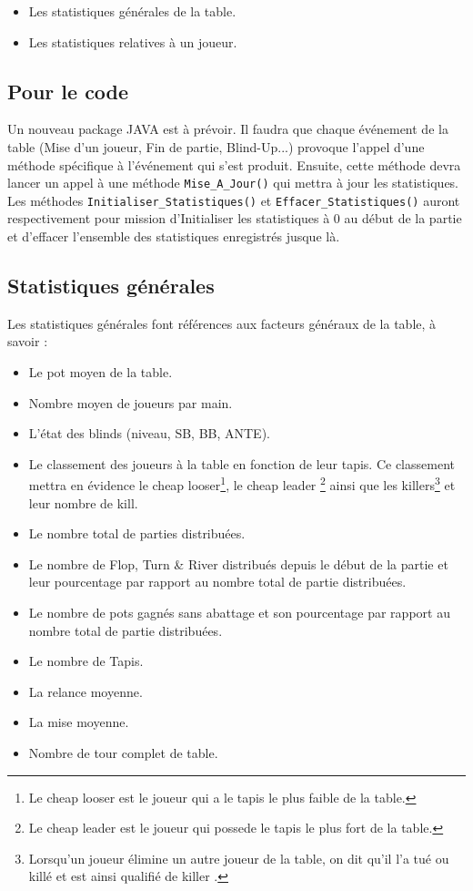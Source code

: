 \begin{itemize}
	\item Les statistiques générales de la table.
	\item Les statistiques relatives à un joueur.
\end{itemize} 

\subsection{Pour le code}

Un nouveau package JAVA est à prévoir.
Il faudra que chaque événement de la table (Mise d'un joueur, Fin de partie, 
Blind-Up...) provoque l'appel d'une méthode spécifique à l'événement qui s'est 
produit.
Ensuite, cette méthode devra lancer un appel à une méthode 
\texttt{Mise\_A\_Jour()}  qui mettra à jour les statistiques.
Les méthodes \texttt{Initialiser\_Statistiques()} et 
\texttt{Effacer\_Statistiques()} auront respectivement pour mission d'Initialiser
les statistiques à 0 au début de la partie et d'effacer l'ensemble des statistiques
 enregistrés jusque là.

\subsection{Statistiques générales}

Les statistiques générales font références aux facteurs généraux de la table,
 à savoir : 

\begin{itemize}
	\item Le pot moyen de la table.
	\item Nombre moyen de joueurs par main.
	\item L'état des blinds (niveau, SB, BB, ANTE).
	\item Le classement des joueurs à  la table en fonction de leur tapis. 
	     Ce classement mettra en évidence le cheap looser\footnote{Le cheap looser
	    est le joueur qui a le tapis le plus faible de la table.}, le cheap leader
	    \footnote{Le cheap leader est le joueur qui possede le tapis le plus fort 
	    de la table.} ainsi que les killers\footnote{Lorsqu'un joueur élimine un
	     autre joueur de la table, on dit qu'il l'a tué ou \og killé \fg et est 
	    ainsi qualifié de \og killer \fg.} et leur nombre de kill.
	\item Le nombre total de parties distribuées.
	\item Le nombre de Flop, Turn \& River distribués depuis le début de la partie
	      et leur pourcentage par rapport au nombre total de partie distribuées.
	\item Le nombre de pots gagnés sans abattage et son pourcentage par rapport
	      au nombre total de partie distribuées.
	\item Le nombre de Tapis. 
	\item La relance moyenne.
	\item La mise moyenne.
	\item Nombre de tour complet de table.
\end{itemize}

